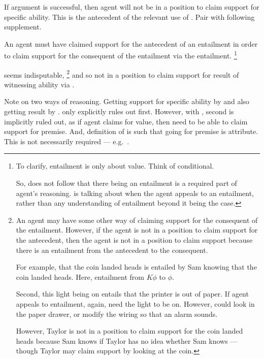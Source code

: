 \begin{note}
  If argument is successful, then agent will not be in a position to claim support for specific ability.
  This is the antecedent of the relevant use of \aben{}.
  Pair \nI{} with following supplement.

  \begin{proposition}[\nIm{}]
    An agent must have claimed support for the antecedent of an entailment in order to claim support for the consequent of the entailment via the entailment.\nolinebreak
    \footnote{To clarify, entailment is only about value.
      Think of conditional.

      So, does not follow that there being an entailment is a required part of agent's reasoning.
      \nIm{} is talking about when the agent appeals to an entailment, rather than any understanding of entailment beyond it being the case.
    }
  \end{proposition}
  \nIm{} seems indisputable,\nolinebreak
  \footnote{
    An agent may have some other way of claiming support for the consequent of the entailment.
    However, if the agent is not in a position to claim support for the antecedent, then the agent is not in a position to claim support because there is an entailment from the antecedent to the consequent.\nolinebreak

    For example, that the coin landed heads is entailed by Sam knowing that the coin landed heads.
    Here, entailment from \(K\phi\) to \(\phi\).

    Second, this light being on entails that the printer is out of paper.
    If agent appeals to entailment, again, need the light to be on.
    However, could look in the paper drawer, or modify the wiring so that an alarm sounds.

    However, Taylor is not in a position to claim support for the coin landed heads because Sam knows if Taylor has no idea whether Sam knows --- though Taylor may claim support by looking at the coin.
  }
  and so not in a position to claim support for result of witnessing ability via \AR{}.
\end{note}

\begin{note}
  Note on two ways of reasoning.
  Getting support for specific ability by \RBV{} and also getting result by \RBV{}.
  \nI{} only explicitly rules out first.
  However, with \nIm{}, second is implicitly ruled out, as if agent claims for value, then need to be able to claim support for premise.
  And, definition of \AR{} is such that going for premise is attribute.
  This is not necessarily required --- e.g.\ \WR{}.
\end{note}

